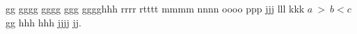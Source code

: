 \documentclass{report}
\begin{document}
gg gggg gggg ggg gggghhh rrrr rtttt mmmm nnnn oooo ppp jjj lll kkk $a~>~b < c$ gg hhh hhh jjjj jj.
\end{document}
